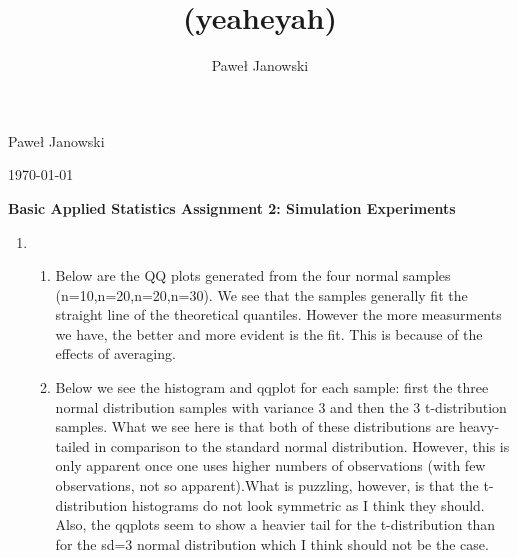 \documentclass[11pt,letterpaper]{article}
\title{(yeaheyah)}
\author{Pawe\l{} Janowski}
\begin{document}
\begin{flushright}
\parskip 0pt
Pawe\l{} Janowski
 
\today
\vspace{10 mm}
\end{flushright}
\begin{center}
\begin{Large}
\textbf{Basic Applied Statistics
Assignment 2: Simulation Experiments}
\vspace{10 mm}
\end{Large}
\end{center}


\begin{enumerate}
\item 
  \begin{enumerate}
  \item Below are the QQ plots generated from the four normal samples (n=10,n=20,n=20,n=30). We see that the samples generally fit the straight line of the theoretical quantiles. However the more measurments we have, the better and more evident is the fit. This is because of the effects of averaging.
    
    \begin{figure}[H]
            \setcounter{subfigure}{0}
            \centering
            \quad
        \end{figure}
        
  \item Below we see the histogram and qqplot for each sample: first the three normal distribution samples with variance 3 and then the 3 t-distribution samples. What we see here is that both of these distributions are heavy-tailed in comparison to the standard normal distribution. However, this is only apparent once one uses higher numbers of observations (with few observations, not so apparent).What is puzzling, however, is that the t-distribution histograms do not look symmetric as I think they should. Also, the qqplots seem to show a heavier tail for the t-distribution than for the sd=3 normal distribution which I think should not be the case.
      \begin{figure}[H]
          \setcounter{subfigure}{0}
          \centering
          

\end{figure}
\end{enumerate}
\end{enumerate}
\end{document}

